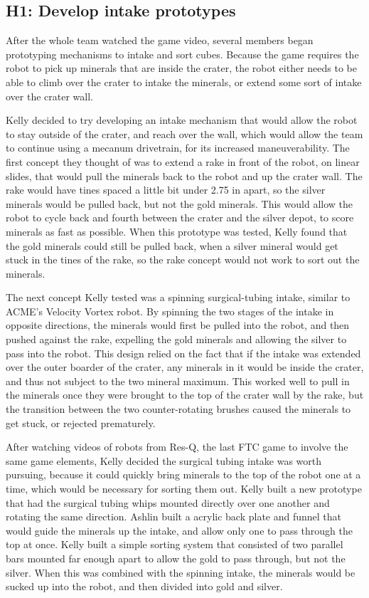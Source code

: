 \documentclass{article}
\begin{document}
\subsection{H1: Develop intake prototypes}

After the whole team watched the game video, several members began prototyping mechanisms to intake and sort cubes. Because the game requires the robot to pick up minerals that are inside the crater, the robot either needs to be able to climb over the crater to intake the minerals, or extend some sort of intake over the crater wall. 

Kelly decided to try developing an intake mechanism that would allow the robot to stay outside of the crater, and reach over the wall, which would allow the team to continue using a mecanum drivetrain, for its increased maneuverability. The first concept they thought of was to extend a rake in front of the robot, on linear slides, that would pull the minerals back to the robot and up the crater wall. The rake would have tines spaced a little bit under 2.75 in apart, so the silver minerals would be pulled back, but not the gold minerals. This would allow the robot to cycle back and fourth between the crater and the silver depot, to score minerals as fast as possible. When this prototype was tested, Kelly found that the gold minerals could still be pulled back, when a silver mineral would get stuck in the tines of the rake, so the rake concept would not work to sort out the minerals. 

The next concept Kelly tested was a spinning surgical-tubing intake, similar to ACME's Velocity Vortex robot. By spinning the two stages of the intake in opposite directions, the minerals would first be pulled into the robot, and then pushed against the rake, expelling the gold minerals and allowing the silver to pass into the robot. This design relied on the fact that if the intake was extended over the outer boarder of the crater, any minerals in it would be inside the crater, and thus not subject to the two mineral maximum. This worked well to pull in the minerals once they were brought to the top of the crater wall by the rake, but the transition between the two counter-rotating brushes caused the minerals to get stuck, or rejected prematurely. 

After watching videos of robots from Res-Q, the last FTC game to involve the same game elements, Kelly decided the surgical tubing intake was worth pursuing, because it could quickly bring minerals to the top of the robot one at a time, which would be necessary for sorting them out. Kelly built a new prototype that had the surgical tubing whips mounted directly over one another and rotating the same direction. Ashlin built a acrylic back plate and funnel that would guide the minerals up the intake, and allow only one to pass through the top at once. Kelly built a simple sorting system that consisted of two parallel bars mounted far enough apart to allow the gold to pass through, but not the silver. When this was combined with the spinning intake, the minerals would be sucked up into the robot, and then divided into gold and silver. 
\end{document}
